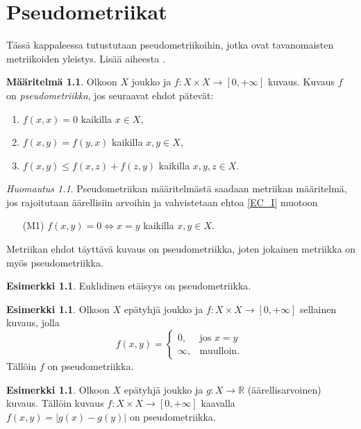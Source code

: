 \documentclass[12pt,a4paper,leqno]{report}
\newcommand{\R}{\mathbb{R}}
\theoremstyle{plain}
\theoremstyle{definition}
\newtheorem{maar}[equation]{Määritelmä}
\newtheorem{esim}[equation]{Esimerkki}
\theoremstyle{remark}
\newtheorem{huom}[equation]{Huomautus}
\begin{document}
\chapter{Pseudometriikat}
Tässä kappaleessa tutustutaan pseudometriikoihin, jotka ovat tavanomaisten metriikoiden yleistys. Lisää aiheesta \cite{Eom2}.
\begin{maar}
Olkoon $X$ joukko ja $f\colon X\times X\rightarrow [0,+\infty]$ 
kuvaus. Kuvaus $f$ on \emph{pseudometriikka}, jos seuraavat ehdot pätevät:
\begin{enumerate} [label=(P\arabic*),ref=(P\arabic*)]
\item\label{EC_I} $f(x,x)=0$ kaikilla $x\in X$,
\item\label{EC_II} $f(x,y)=f(y,x)$ kaikilla $x,y\in X$,
\item\label{EC_III} $f(x,y)\leq f(x,z)+f(z,y)$ kaikilla $x,y,z\in X$.
\end{enumerate}
\end{maar}
\begin{huom}
Pseudometriikan määritelmästä saadaan metriikan määritelmä, jos rajoitutaan äärellisiin arvoihin ja vahvistetaan ehtoa \ref{EC_I} muotoon 
\begin{enumerate} %
\item[(M1)]\label{M1} $f(x,y)=0\Leftrightarrow x=y$ kaikilla $x,y\in X.$
\end{enumerate}
Metriikan ehdot täyttävä kuvaus on pseudometriikka, 
joten %
jokainen metriikka on myös pseudometriikka.
\end{huom}
\begin{esim}%
Euklidinen etäisyys on pseudometriikka.
\end{esim}
\begin{esim}%
Olkoon $X$ epätyhjä joukko ja $f\colon X\times X\rightarrow [0,+\infty]$ sellainen kuvaus, jolla
\begin{equation*}
f(x,y) = \begin{cases} 0, & \mbox{jos } x=y\\
\infty, & \mbox{muulloin. } \end{cases}
\end{equation*}
Tällöin $f$ on pseudometriikka.
\end{esim}
\begin{esim}%
Olkoon $X$ epätyhjä joukko ja $g\colon X\rightarrow \R$ (äärellisarvoinen) kuvaus. Tällöin kuvaus $f\colon X\times X\rightarrow[0,+\infty]$ kaavalla $f(x,y)=|g(x)-g(y)|$ on pseudometriikka.
\end{esim}
\end{document}
